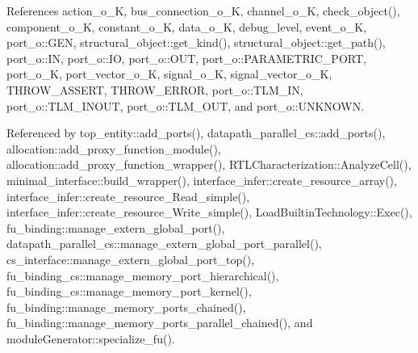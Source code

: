 References action\+\_\+o\+\_\+K, bus\+\_\+connection\+\_\+o\+\_\+K, channel\+\_\+o\+\_\+K, check\+\_\+object(), component\+\_\+o\+\_\+K, constant\+\_\+o\+\_\+K, data\+\_\+o\+\_\+K, debug\+\_\+level, event\+\_\+o\+\_\+K, port\+\_\+o\+::\+G\+EN, structural\+\_\+object\+::get\+\_\+kind(), structural\+\_\+object\+::get\+\_\+path(), port\+\_\+o\+::\+IN, port\+\_\+o\+::\+IO, port\+\_\+o\+::\+O\+UT, port\+\_\+o\+::\+P\+A\+R\+A\+M\+E\+T\+R\+I\+C\+\_\+\+P\+O\+RT, port\+\_\+o\+\_\+K, port\+\_\+vector\+\_\+o\+\_\+K, signal\+\_\+o\+\_\+K, signal\+\_\+vector\+\_\+o\+\_\+K, T\+H\+R\+O\+W\+\_\+\+A\+S\+S\+E\+RT, T\+H\+R\+O\+W\+\_\+\+E\+R\+R\+OR, port\+\_\+o\+::\+T\+L\+M\+\_\+\+IN, port\+\_\+o\+::\+T\+L\+M\+\_\+\+I\+N\+O\+UT, port\+\_\+o\+::\+T\+L\+M\+\_\+\+O\+UT, and port\+\_\+o\+::\+U\+N\+K\+N\+O\+WN.



Referenced by top\+\_\+entity\+::add\+\_\+ports(), datapath\+\_\+parallel\+\_\+cs\+::add\+\_\+ports(), allocation\+::add\+\_\+proxy\+\_\+function\+\_\+module(), allocation\+::add\+\_\+proxy\+\_\+function\+\_\+wrapper(), R\+T\+L\+Characterization\+::\+Analyze\+Cell(), minimal\+\_\+interface\+::build\+\_\+wrapper(), interface\+\_\+infer\+::create\+\_\+resource\+\_\+array(), interface\+\_\+infer\+::create\+\_\+resource\+\_\+\+Read\+\_\+simple(), interface\+\_\+infer\+::create\+\_\+resource\+\_\+\+Write\+\_\+simple(), Load\+Builtin\+Technology\+::\+Exec(), fu\+\_\+binding\+::manage\+\_\+extern\+\_\+global\+\_\+port(), datapath\+\_\+parallel\+\_\+cs\+::manage\+\_\+extern\+\_\+global\+\_\+port\+\_\+parallel(), cs\+\_\+interface\+::manage\+\_\+extern\+\_\+global\+\_\+port\+\_\+top(), fu\+\_\+binding\+\_\+cs\+::manage\+\_\+memory\+\_\+port\+\_\+hierarchical(), fu\+\_\+binding\+\_\+cs\+::manage\+\_\+memory\+\_\+port\+\_\+kernel(), fu\+\_\+binding\+::manage\+\_\+memory\+\_\+ports\+\_\+chained(), fu\+\_\+binding\+::manage\+\_\+memory\+\_\+ports\+\_\+parallel\+\_\+chained(), and module\+Generator\+::specialize\+\_\+fu().

